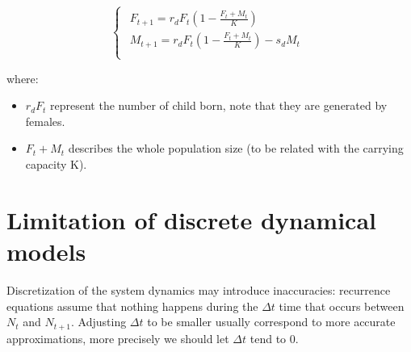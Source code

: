 \[
\begin{cases}
    \begin{aligned}
        F_{t+1} = r_{d}F_{t}(1 - \frac{F_{t} + M_{t}} {K}) \\
        M_{t+1} = r_{d}F_{t}(1 - \frac{F_{t} + M_{t}}{K}) - s_{d}M_{t}\\
    \end{aligned}
\end{cases}
\]

where:
\begin{itemize}
    \item $r_{d}F_{t}$ represent the number of child born, note that they are generated by females.

    \item $F_{t} + M_{t}$ describes the whole population size (to be related with the carrying capacity K).
\end{itemize}

\section{Limitation of discrete dynamical models}
Discretization of the system dynamics may introduce inaccuracies: recurrence equations assume that nothing happens during the $\Delta{t}$ time that occurs between $N_{t}$ and $N_{t+1}$. Adjusting $\Delta{t}$ to be smaller usually correspond to more accurate approximations, more precisely we should let $\Delta{t}$ tend to 0.

